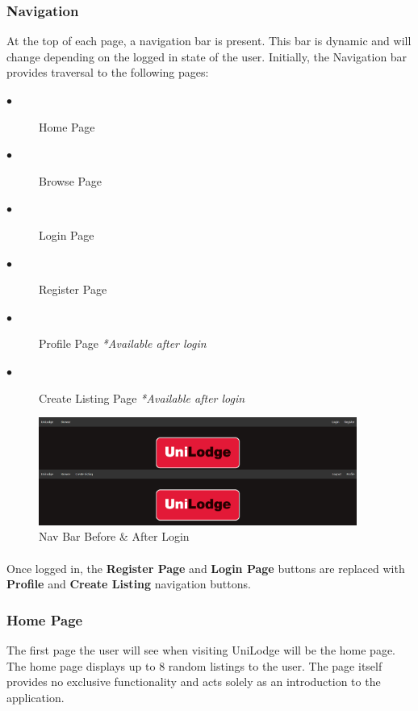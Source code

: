 \subsubsection{Navigation}
At the top of each page, a navigation bar is present. This bar is dynamic and will change depending on the logged in state of the user. Initially, the Navigation bar provides traversal to the following pages:

\begin{description}
  \item[$\bullet$] Home Page
  \item[$\bullet$] Browse Page
  \item[$\bullet$] Login Page
  \item[$\bullet$] Register Page
  \item[$\bullet$] Profile Page \textit{*Available after login}
  \item[$\bullet$] Create Listing Page \textit{*Available after login}
\end{description}

\begin{figure}[H]
	\caption{Nav Bar Before \& After Login}
	\label{image:home}
	\centering
	\includegraphics[width=0.93\textwidth]{images/navbar.png}
\end{figure}

\paragraph{}
Once logged in, the \textbf{Register Page} and \textbf{Login Page} buttons are replaced with \textbf{Profile} and \textbf{Create Listing} navigation buttons.

\subsubsection{Home Page}
The first page the user will see when visiting UniLodge will be the home page. The home page displays up to 8 random listings to the user. The page itself provides no exclusive functionality and acts solely as an introduction to the application. 

